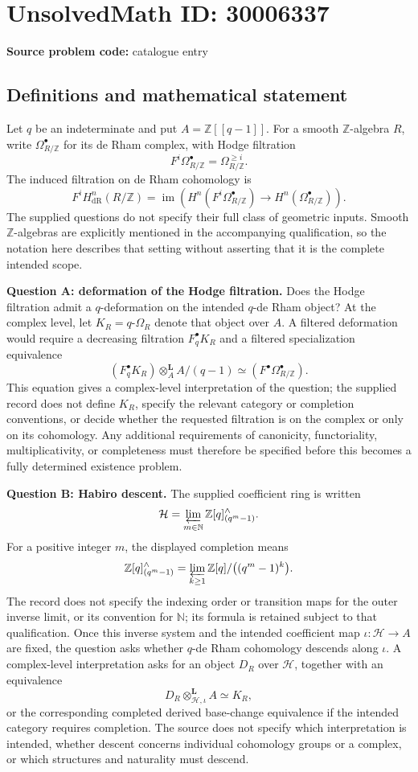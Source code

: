 \documentclass[11pt]{article}
\newcommand{\N}{\mathbb{N}}
\newcommand{\Z}{\mathbb{Z}}
\begin{document}
\section*{UnsolvedMath ID: 30006337}
\textbf{Source problem code:} catalogue entry
\subsection{Definitions and mathematical statement}
Let \(q\) be an indeterminate and put \(A=\Z[[q-1]]\). For a smooth \(\Z\)-algebra \(R\), write \(\Omega^\bullet_{R/\Z}\) for its de Rham complex, with Hodge filtration
\[
F^i\Omega^\bullet_{R/\Z}=\Omega^{\geq i}_{R/\Z}.
\]
The induced filtration on de Rham cohomology is
\[
F^iH^n_{\mathrm{dR}}(R/\Z)
=\operatorname{im}\!\left(
H^n(F^i\Omega^\bullet_{R/\Z})\longrightarrow
H^n(\Omega^\bullet_{R/\Z})\right).
\]
The supplied questions do not specify their full class of geometric inputs. Smooth \(\Z\)-algebras are explicitly mentioned in the accompanying qualification, so the notation here describes that setting without asserting that it is the complete intended scope.

\textbf{Question A: deformation of the Hodge filtration.}
Does the Hodge filtration admit a \(q\)-deformation on the intended \(q\)-de Rham object? At the complex level, let \(K_R=q\text{-}\Omega_R\) denote that object over \(A\). A filtered deformation would require a decreasing filtration \(F_q^\bullet K_R\) and a filtered specialization equivalence
\[
\left(F_q^\bullet K_R\right)\otimes_A^{\mathbf L} A/(q-1)
\simeq
\left(F^\bullet\Omega^\bullet_{R/\Z}\right).
\]
This equation gives a complex-level interpretation of the question; the supplied record does not define \(K_R\), specify the relevant category or completion conventions, or decide whether the requested filtration is on the complex or only on its cohomology. Any additional requirements of canonicity, functoriality, multiplicativity, or completeness must therefore be specified before this becomes a fully determined existence problem.

\textbf{Question B: Habiro descent.}
The supplied coefficient ring is written
\[
\mathcal H=\varprojlim_{m\in\N}
\Z[q]^{\wedge}_{(q^m-1)}.
\]
For a positive integer \(m\), the displayed completion means
\[
\Z[q]^{\wedge}_{(q^m-1)}
=\varprojlim_{k\geq1}\Z[q]/\bigl((q^m-1)^k\bigr).
\]
The record does not specify the indexing order or transition maps for the outer inverse limit, or its convention for \(\N\); its formula is retained subject to that qualification. Once this inverse system and the intended coefficient map \(\iota:\mathcal H\to A\) are fixed, the question asks whether \(q\)-de Rham cohomology descends along \(\iota\). A complex-level interpretation asks for an object \(D_R\) over \(\mathcal H\), together with an equivalence
\[
D_R\otimes^{\mathbf L}_{\mathcal H,\iota}A\simeq K_R,
\]
or the corresponding completed derived base-change equivalence if the intended category requires completion. The source does not specify which interpretation is intended, whether descent concerns individual cohomology groups or a complex, or which structures and naturality must descend.
\end{document}
